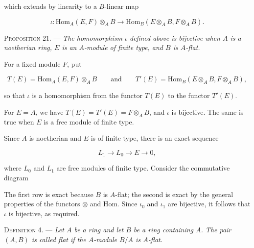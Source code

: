 which extends by linearity to a $B$-linear map

\begin{equation*}
\iota:\mathrm{Hom}_A(E,F)\otimes_AB\longrightarrow
\mathrm{Hom}_B(E\otimes_AB,F\otimes_AB).
\end{equation*}

\textsc{Proposition 21}. --- \emph{The homomorphism
$\iota$ defined above is bijective when $A$ is a noetherian ring, $E$ is an
$A$-module of finite type, and $B$ is $A$-flat.}

For a fixed module $F$, put

\begin{equation*}
T(E)=\mathrm{Hom}_A(E,F)\otimes_AB
\qquad\text{and}\qquad
T'(E)=\mathrm{Hom}_B(E\otimes_AB,F\otimes_AB),
\end{equation*}

so that $\iota$ is a homomorphism from the functor $T(E)$ to the functor
$T'(E)$.

For $E=A$, we have $T(E)=T'(E)=F\otimes_AB$, and $\iota$ is bijective. The
same is true when $E$ is a free module of finite type.

Since $A$ is noetherian and $E$ is of finite type, there is an exact sequence

\begin{equation*}
L_1\longrightarrow L_0\longrightarrow E\longrightarrow0,
\end{equation*}

where $L_0$ and $L_1$ are free modules of finite type. Consider the
commutative diagram

\begin{center}
\end{center}

The first row is exact because $B$ is $A$-flat; the second is exact by the
general properties of the functors $\otimes$ and $\mathrm{Hom}$. Since
$\iota_0$ and $\iota_1$ are bijective, it follows that $\iota$ is bijective,
as required.


\textsc{Definition 4}. --- \emph{Let $A$ be a ring and
let $B$ be a ring containing $A$. The pair $(A,B)$ is called flat if the
$A$-module $B/A$ is $A$-flat.}

